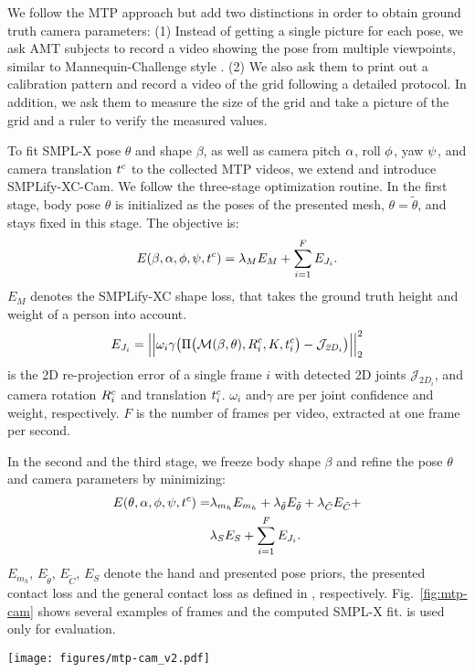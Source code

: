 \documentclass[10pt,twocolumn,letterpaper,usenames,dvipsnames]{article}
\begin{document}
We follow the MTP approach but add two distinctions in order to obtain ground truth camera parameters:
(1) Instead of getting a single picture for each pose, we ask AMT subjects to record a video showing the pose from multiple viewpoints, similar to Mannequin-Challenge style \cite{li2019learning}.
(2) We also ask them to print out a calibration pattern and record a video of the grid following a detailed protocol. In addition, we ask them to measure the size of the grid and take a picture of the grid and a ruler to verify the measured values.

To fit SMPL-X pose $\theta$ and shape $\beta$, as well as camera pitch $\alpha$, roll $\phi$, yaw $\psi$, 
and camera translation $t^c$ to the collected MTP videos, we extend \smplifyxc and introduce SMPLify-XC-Cam. 
We follow the three-stage optimization routine.
In the first stage, body pose $\theta$ is initialized as the poses of the presented mesh, $\theta = \tilde{\theta}$, and stays fixed in this stage. The objective is:
\begin{equation}
E(\beta, \alpha, \phi, \psi, t^c) = \lambda_M E_M + \sum_{i=1}^{F} E_{J_i} \text{.}
\end{equation}
$E_M$ denotes the SMPLify-XC shape loss, that takes the ground truth height and weight of a person into account. 
\begin{equation}
    E_{J_i} = \Big|\Big| \omega_i \gamma \big( \Pi \big(\mathcal{M}(\beta, \theta), R^c_i, K, t^c_{i} \big) - \mathcal{J}_{\mathit{2D}_i} \big) \Big|\Big|^{2}_{2}
\end{equation}
is the 2D re-projection error of a single frame $i$ with detected 2D joints $\mathcal{J}_{\mathit{2D}_i}$, and camera rotation $R^c_i$ and translation $t^c_i$. $\omega_i$ and$\gamma$ are per joint confidence and weight, respectively. $F$ is the number of frames per video, extracted at one frame per second. 

In the second and the third stage, we freeze body shape $\beta$ and refine the pose $\theta$ and camera parameters by minimizing: 
\begin{align}
\begin{split}
E(\theta, \alpha, \phi, \psi, t^c) = & \lambda_{m_h}E_{m_h} + \lambda_{\tilde{\theta}} E_{\tilde{\theta}} + \lambda_{\tilde{C}} E_{\tilde{C}} + \\
                                        & \lambda_{S} E_{S} + \sum_{i=1}^{F} E_{J_i} \text{.}
\end{split}
\end{align}
$E_{m_h}$, $E_{\tilde{\theta}}$, $E_{\tilde{C}}$, $E_{S}$ denote the hand and presented pose priors, the presented contact loss and the general contact loss as defined in \cite{Mueller:CVPR:21}, respectively.
Fig.~\ref{fig:mtp-cam} shows several examples of \mtpcam frames and the computed SMPL-X fit.
\mtpcam is used only for evaluation.
\begin{figure*}
    \centering
    \texttt{[image: figures/mtp-cam\_v2.pdf]}
    \caption{\textbf{\mtpcam benchmark samples.}}
    \label{fig:mtp-cam}
\end{figure*}
\end{document}
